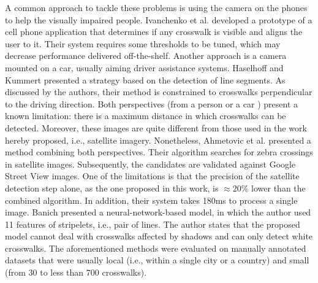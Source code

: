 \documentclass[journal]{IEEEtran}
\begin{document}
A common approach to tackle these problems is using the camera on the phones to help the visually impaired people. Ivanchenko et al. \cite{ivanchenko2008detecting} developed a prototype of a cell phone application that determines if any crosswalk is visible and aligns the user to it. Their system requires some thresholds to be tuned, which may decrease performance delivered off-the-shelf. Another approach is a camera mounted on a car, usually aiming driver assistance systems. Haselhoff and Kummert \cite{haselhoff2010crosswalkadas} presented a strategy based on the detection of line segments. As discussed by the authors, their method is constrained to crosswalks perpendicular to the driving direction. Both perspectives (from a person \cite{ivanchenko2008detecting} or a car \cite{haselhoff2010crosswalkadas}) present a known limitation: there is a maximum distance in which crosswalks can be detected. Moreover, these images are quite different from those used in the work hereby proposed, i.e., satellite imagery. Nonetheless, Ahmetovic et al. \cite{ahmetovic2015zebra} presented a method combining both perspectives. Their algorithm searches for zebra crossings in satellite images. Subsequently, the candidates are validated against Google Street View images. One of the limitations is that the precision of the satellite detection step alone, as the one proposed in this work, is $\approx 20\%$ lower than the combined algorithm. In addition, their system takes 180ms to process a single image. Banich \cite{banich2016crosswalk} presented a neural-network-based model, in which the author used 11 features of stripelets, i.e., pair of lines. The author states that the proposed model cannot deal with crosswalks affected by shadows and can only detect white crosswalks. The aforementioned methods \cite{ivanchenko2008detecting, haselhoff2010crosswalkadas, ahmetovic2015zebra, banich2016crosswalk} were evaluated on manually annotated datasets that were usually local (i.e., within a single city or a country) and small (from 30 to less than 700 crosswalks).
\end{document}
